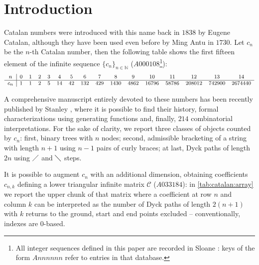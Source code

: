 
\section{Introduction}

\noindent Catalan numbers were introduced with this name back in $1838$ by
Eugene Catalan, although they have been used even before by Ming Antu
in $1730$. Let $c_{n}$ be the $n$-th Catalan number, then the following
table shows the first fifteen element of the infinite sequence 
$\lbrace c_{n}\rbrace_{n\in\mathbb{N}}$ ($A000108$\footnote{All integer sequences
defined in this paper are recorded in Sloane \cite{sloane:oeis}: keys of
the form $Annnnnn$ refer to entries in that database.}):
\begin{displaymath}
    \footnotesize
    \begin{array}{c|ccccccccccccccc}
        n & 0 & 1 & 2 & 3 & 4 & 5 & 6 & 7 & 8 & 9 & 10 & 11 & 12 & 13 & 14 \\
        \hline
        c_{n} & 1 & 1 & 2 & 5 & 14 & 42 & 132 & 429 & 1430 & 4862 & 16796 & 58786 & 208012 & 742900 & 2674440
    \end{array}
\end{displaymath}

A comprehensive manuscript entirely devoted to these numbers has been recently
published by Stanley \cite{stanley:2015}, where it is possible to find their history,
formal characterizations using generating functions and, finally, $214$ combinatorial 
interpretations.  For the sake of clarity, we report three classes of objects counted by 
$c_{n}$: first, binary trees with $n$ nodes; 
second, admissible bracketing of a string with length $n+1$ using $n-1$ pairs
of curly braces; at last, Dyck paths of length $2n$ using $\diagup$ and $\diagdown$ steps.

It is possible to augment $c_{n}$ with an additional dimension,
obtaining coefficients $c_{n,k}$ defining a lower triangular infinite 
matrix $\mathcal{C}$ ($A033184$): in \autoref{tab:catalan:array} 
we report the upper chunk of that matrix where a coefficient at row $n$ 
and column $k$ can be interpreted as the number
of Dyck paths of length $2(n+1)$ with $k$ returns to the ground, start
and end points excluded -- conventionally, indexes are $0$-based.



